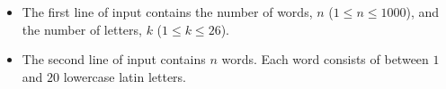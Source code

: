 

\begin{itemize}
  \item The first line of input contains the number of words, $n$ ($1 \le n \le 1000$),
        and the number of letters, $k$ ($1 \le k \le 26$).

  \item The second line of input contains $n$ words. Each word consists of between
        $1$ and $20$ lowercase latin letters.
\end{itemize}

